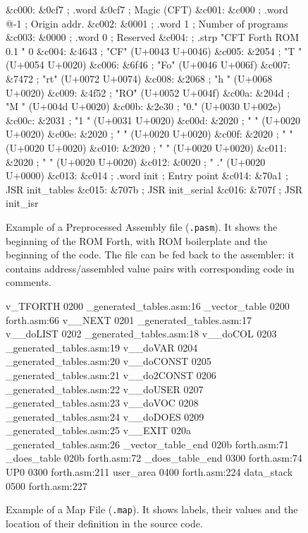 \begin{figure}
\begin{cftasmcode}
&c000: &0cf7 ;         .word &0cf7             ; Magic (CFT)
&c001: &c000 ;         .word @-1               ; Origin addr.
&c002: &0001 ;         .word 1                 ; Number of programs
&c003: &0000 ;         .word 0                 ; Reserved
&c004:       ;         .strp "CFT Forth ROM 0.1            " 0
&c004: &4643 ; "CF" (U+0043 U+0046)
&c005: &2054 ; "T " (U+0054 U+0020)
&c006: &6f46 ; "Fo" (U+0046 U+006f)
&c007: &7472 ; "rt" (U+0072 U+0074)
&c008: &2068 ; "h " (U+0068 U+0020)
&c009: &4f52 ; "RO" (U+0052 U+004f)
&c00a: &204d ; "M " (U+004d U+0020)
&c00b: &2e30 ; "0." (U+0030 U+002e)
&c00c: &2031 ; "1 " (U+0031 U+0020)
&c00d: &2020 ; "  " (U+0020 U+0020)
&c00e: &2020 ; "  " (U+0020 U+0020)
&c00f: &2020 ; "  " (U+0020 U+0020)
&c010: &2020 ; "  " (U+0020 U+0020)
&c011: &2020 ; "  " (U+0020 U+0020)
&c012: &0020 ; " ." (U+0020 U+0000)
&c013: &c014 ;         .word init              ; Entry point
&c014: &70a1 ;         JSR init_tables
&c015: &707b ;         JSR init_serial
&c016: &707f ;         JSR init_isr
\end{cftasmcode}
\caption[Preprocessed Assembly Output Example]{\label{fig:pasm-file} Example of
  a Preprocessed Assembly file (\texttt{.pasm}). It shows the beginning of the
  ROM Forth, with ROM boilerplate and the beginning of the code. The file can
  be fed back to the assembler: it contains address/assembled value pairs with
  corresponding code in comments.}
\end{figure}


\begin{figure}
\begin{intrcode}
v_TFORTH                  0200  _generated_tables.asm:16
_vector_table             0200  forth.asm:66
v__NEXT                   0201  _generated_tables.asm:17
v__doLIST                 0202  _generated_tables.asm:18
v__doCOL                  0203  _generated_tables.asm:19
v__doVAR                  0204  _generated_tables.asm:20
v__doCONST                0205  _generated_tables.asm:21
v__do2CONST               0206  _generated_tables.asm:22
v__doUSER                 0207  _generated_tables.asm:23
v__doVOC                  0208  _generated_tables.asm:24
v__doDOES                 0209  _generated_tables.asm:25
v__EXIT                   020a  _generated_tables.asm:26
_vector_table_end         020b  forth.asm:71
_does_table               020b  forth.asm:72
_does_table_end           0300  forth.asm:74
UP0                       0300  forth.asm:211
user_area                 0400  forth.asm:224
data_stack                0500  forth.asm:227
\end{intrcode}
\caption[Map File Example]{\label{fig:map-file} Example of a Map File
  (\texttt{.map}). It shows labels, their values and the location of their
  definition in the source code.}
\end{figure}


